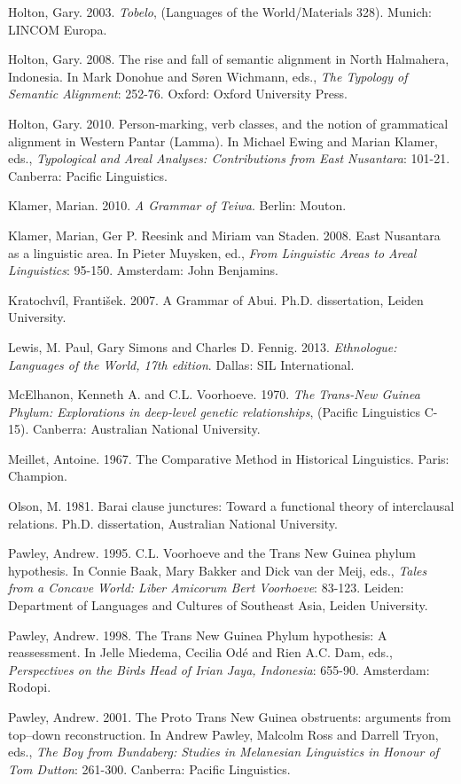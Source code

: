 Holton, Gary. 2003. \textit{Tobelo}, (Languages of the World/Materials 328). Munich: LINCOM Europa.

Holton, Gary. 2008. The rise and fall of semantic alignment in North Halmahera, Indonesia. In Mark Donohue and S{\o}ren Wichmann, eds., \textit{The Typology of Semantic Alignment}: 252-76. Oxford: Oxford University Press.

Holton, Gary. 2010. Person-marking, verb classes, and the notion of grammatical alignment in Western Pantar (Lamma). In Michael Ewing and Marian Klamer, eds., \textit{Typological and Areal Analyses: Contributions from East Nusantara}: 101-21. Canberra: Pacific Linguistics.

Klamer, Marian. 2010. \textit{A Grammar of Teiwa}. Berlin: Mouton.

Klamer, Marian, Ger P. Reesink and Miriam van Staden. 2008. East Nusantara as a linguistic area. In Pieter Muysken, ed., \textit{From Linguistic Areas to Areal Linguistics}: 95-150. Amsterdam: John Benjamins.

Kratochv\'il, Franti\v{s}ek. 2007. A Grammar of Abui. Ph.D. dissertation, Leiden University.

Lewis, M. Paul, Gary Simons and Charles D. Fennig. 2013. \textit{Ethnologue: Languages of the World, 17th edition}. Dallas: SIL International.

McElhanon, Kenneth A. and C.L. Voorhoeve. 1970. \textit{The Trans-New Guinea Phylum: Explorations in deep-level genetic relationships}, (Pacific Linguistics C-15). Canberra: Australian National University.

Meillet, Antoine. 1967. The Comparative Method in Historical Linguistics. Paris: Champion.

Olson, M. 1981. Barai clause junctures: Toward a functional theory of interclausal relations. Ph.D. dissertation, Australian National University.

Pawley, Andrew. 1995. C.L. Voorhoeve and the Trans New Guinea phylum hypothesis. In Connie Baak, Mary Bakker and Dick van der Meij, eds., \textit{Tales from a Concave World: Liber Amicorum Bert Voorhoeve}: 83-123. Leiden: Department of Languages and Cultures of Southeast Asia, Leiden University.

Pawley, Andrew. 1998. The Trans New Guinea Phylum hypothesis: A reassessment. In Jelle Miedema, Cecilia  Od\'e and Rien A.C. Dam, eds., \textit{Perspectives on the Bird{\textquotesingle}s Head of Irian Jaya, Indonesia}: 655-90. Amsterdam: Rodopi.

Pawley, Andrew. 2001. The Proto Trans New Guinea obstruents: arguments from top--down reconstruction. In Andrew Pawley, Malcolm Ross and Darrell Tryon, eds., \textit{The Boy from Bundaberg: Studies in Melanesian Linguistics in Honour of Tom Dutton}: 261-300. Canberra: Pacific Linguistics.

